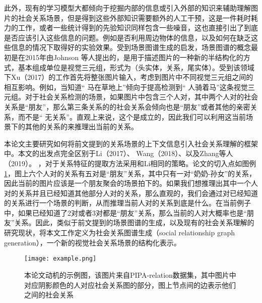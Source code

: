 此外，现有的学习模型大都倾向于挖掘内部的信息或引入外部的知识来辅助理解图片的社会关系场景，但是得到这些外部知识需要额外的人工干预，这是一件耗时耗力的工作，或者一些统计得到的先验知识同样包含一些噪音，这也直接引出了到底是否应该引入这些信息的问题。例如是否利用周边物体的信息，以及如何在缺乏这些信息的情况下取得好的实验效果。受到场景图谱生成的启发，场景图谱的概念最初是在2015年由Johnson 等人\cite{johnson2015image}提出的，是用于描述图片的一种新的半结构化的方式，基本组成单位是视觉三元组，形式为（头实体，关系，尾实体）。受到该领域下Xu（2017）\cite{xu2017scene}的工作首先将整张图片输入，考虑到图片中不同视觉三元组之间的相互影响。例如，当知道`` 马在草地上''倾向于提高检测到`` 人骑着马''这条视觉三元组。对于社会关系检测的场景，如果图片中包含三个人对，其中两个人对的社会关系是``朋友''，那么第三条关系的的社会关系会倾向也是``朋友''或者其他的亲密关系，而不是`` 无关系''。直观上来说，这个是成立的，因此我们可以利用这当前场景下的其他的关系的来推理出当前的关系。

本论文主要研究如何将前文提到的关系场景的上下文信息引入社会关系理解的框架中。本文的出发点完全区别于Li（2017）\cite{li2017dual-glance}、
Wang（2018）\cite{wang2018deep}、以及Zhang等人（2019）\cite{zhang2019multi}。
，对于关系特征的提取方法采用和Li\cite{li2017dual-glance}相同的策略。论文的切入点如图例\ref{fig:intro-example-2}，图上六个人对的关系有五对是``朋友''关系，其中只有一对``奶奶-孙女''的关系，因此当前的图片应该是一个朋友聚会的场景拍下的。如果我们想推理出其中一个人对的关系并且已经知道其他部分人对的关系，那么直观的，我们会通过对已经知道的关系进行一个场景的判断，从而推理当前人对的关系到底是什么。在当前例子中，如果已经知道了2对或者3对都是``朋友''关系，那么当前的人对大概率也是``朋友''关系。因此，类似于前文提到的场景图谱的生成，以及现有的社会关系理解的研究现状，将本文工作定义为社会关系图谱生成（social relationship graph generation），一个新的视觉社会关系场景的结构化表示。
\begin{figure}[htpb]
	\centering
	\texttt{[image: example.png]}
    \caption{本论文动机的示例图，该图片来自PIPA-relation数据集，其中图片中对应阴影颜色的人对应社会关系图的部分，图上节点间的边表示他们之间的社会关系}
	\vspace*{-3.5mm}
	\label{fig:intro-example-2}
\end{figure}

